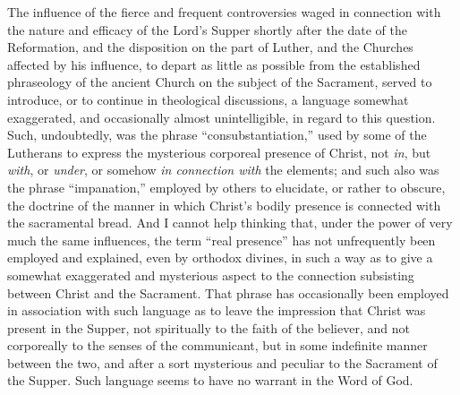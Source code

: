 \documentclass[
]{book}
\begin{document}
The influence of the fierce and frequent controversies waged in connection with the nature and efficacy of the Lord's Supper shortly after the date of the Reformation, and the disposition on the part of Luther, and the Churches affected by his influence, to depart as little as possible from the established phraseology of the ancient Church on the subject of the Sacrament, served to introduce, or to continue in theological discussions, a language somewhat exaggerated, and occasionally almost unintelligible, in regard to this question. Such, undoubtedly, was the phrase ``consubstantiation,'' used by some of the Lutherans to express the mysterious corporeal presence of Christ, not \emph{in}, but \emph{with}, or \emph{under}, or somehow \emph{in connection with} the elements; and such also was the phrase ``impanation,'' employed by others to elucidate, or rather to obscure, the doctrine of the manner in which Christ's bodily presence is connected with the sacramental bread. And I cannot help thinking that, under the power of very much the same influences, the term ``real presence'' has not unfrequently been employed and explained, even by orthodox divines, in such a way as to give a somewhat exaggerated and mysterious aspect to the connection subsisting between Christ and the Sacrament. That phrase has occasionally been employed in association with such language as to leave the impression that Christ was present in the Supper, not spiritually to the faith of the believer, and not corporeally to the senses of the communicant, but in some indefinite manner between the two, and after a sort mysterious and peculiar to the Sacrament of the Supper. Such language seems to have no warrant in the Word of God.
\end{document}
